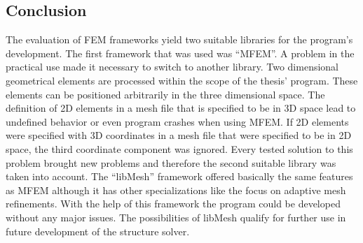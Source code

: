  \subsection{Conclusion}
  The evaluation of FEM frameworks yield two suitable libraries for the program's development. The first framework that was used was ``MFEM''. A problem in the practical use made it necessary to switch to another library. Two dimensional geometrical elements are processed within the scope of the thesis' program. These elements can be positioned arbitrarily in the three dimensional space. The definition of 2D elements in a mesh file that is specified to be in 3D space lead to undefined behavior or even program crashes when using MFEM. If 2D elements were specified with 3D coordinates in a mesh file that were specified to be in 2D space, the third coordinate component was ignored. Every tested solution to this problem brought new problems and therefore the second suitable library was taken into account. The ``libMesh'' framework offered basically the same features as MFEM although it has other specializations like the focus on adaptive mesh refinements. With the help of this framework the program could be developed without any major issues. The possibilities of libMesh qualify for further use in future development of the structure solver.
  
